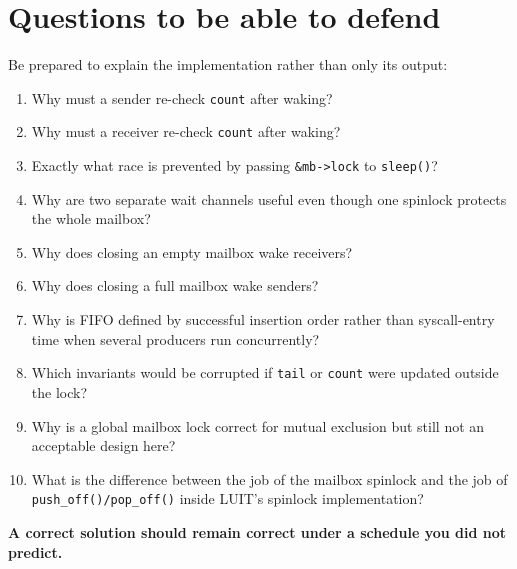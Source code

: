 \documentclass[11pt,a4paper]{article}
\newcommand{\file}[1]{\texttt{#1}}
\begin{document}
\section{Questions to be able to defend}

Be prepared to explain the implementation rather than only its output:

\begin{enumerate}[leftmargin=7mm]
\item Why must a sender re-check \file{count} after waking?
\item Why must a receiver re-check \file{count} after waking?
\item Exactly what race is prevented by passing \file{\&mb->lock} to \file{sleep()}?
\item Why are two separate wait channels useful even though one spinlock protects the whole mailbox?
\item Why does closing an empty mailbox wake receivers?
\item Why does closing a full mailbox wake senders?
\item Why is FIFO defined by successful insertion order rather than syscall-entry time when several producers run concurrently?
\item Which invariants would be corrupted if \file{tail} or \file{count} were updated outside the lock?
\item Why is a global mailbox lock correct for mutual exclusion but still not an acceptable design here?
\item What is the difference between the job of the mailbox spinlock and the job of \file{push\_off()/pop\_off()} inside LUIT's spinlock implementation?
\end{enumerate}

\vfill
\begin{center}
\textbf{A correct solution should remain correct under a schedule you did not predict.}
\end{center}
\end{document}
